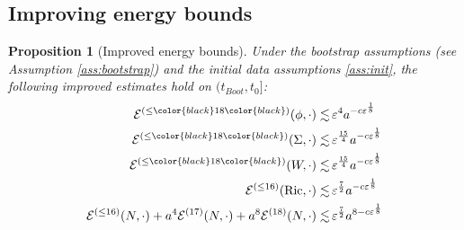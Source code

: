 \documentclass[11pt,leqno,textwidth=10cm]{amsart}
\numberwithin{equation}{section}
\theoremstyle{definition}
\theoremstyle{plain}
\newtheorem{prop}[definition]{Proposition}
\newcommand{\1}{\mathbbm{1}}
\newcommand{\E}{\mathcal{E}}
\newcommand{\Ric}{\text{\normalfont{Ric}}}
\renewcommand{\epsilon}{\varepsilon}
\newcommand{\Lap}{\Delta}
\newcommand{\change}[1]{\color{black}#1\color{black}}
\begin{document}
\subsection{\change{Improving energy bounds}}\label{subsec:bs-imp-core}


\change{\begin{prop}[Improved energy bounds]\label{prop:en-bs-imp} Under the bootstrap assumptions (see Assumption \ref{ass:bootstrap}) and the initial data assumptions \eqref{ass:init}, the following improved estimates hold on $(t_{Boot},t_0]$:
\begin{subequations}
\begin{align}
\E^{(\leq \change{18})}(\phi,\cdot)\lesssim&\,\epsilon^4a^{-c\epsilon^\frac18}\label{eq:en-bs-imp-SF}\\
\E^{(\leq \change{18})}(\Sigma,\cdot)\lesssim&\,\epsilon^\frac{15}4a^{-c\epsilon^\frac18}\label{eq:en-bs-imp-Sigma}\\
\E^{(\leq \change{18})}(W,\cdot)\lesssim&\,\epsilon^\frac{15}4a^{-c\epsilon^\frac18}\label{eq:en-bs-imp-BR}\\
\E^{(\leq 16)}(\Ric,\cdot)\lesssim&\,\epsilon^\frac72a^{-c\epsilon^\frac18}\label{eq:en-bs-imp-Ric}\\
\E^{(\leq 16)}(N,\cdot)+a^4\E^{(17)}(N,\cdot)+a^8\E^{(18)}(N,\cdot)\lesssim&\,\epsilon^\frac72a^{8-c\epsilon^\frac18}\label{eq:en-bs-imp-N}
\end{align}
\end{subequations}
\end{prop}}
\end{document}
